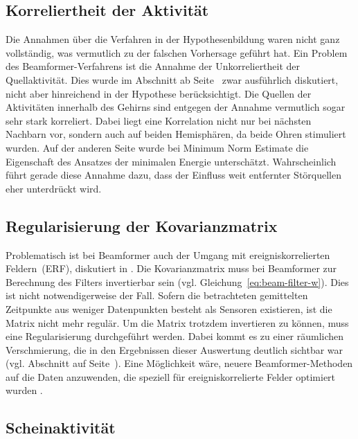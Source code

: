 \documentclass[doc,a4paper,12pt]{apa6}
\makeatletter
\DeclareRobustCommand*{\nameref}[1]{%
      \glqq{\myorg@nameref{#1}}\grqq%
    }%
\makeatother
\begin{document}
\subsection{Korreliertheit der Aktivität}

Die Annahmen über die Verfahren in der Hypothesenbildung waren nicht ganz vollständig, was vermutlich zu der falschen Vorhersage geführt hat. Ein Problem des Beamformer-Verfahrens ist die Annahme der Unkorreliertheit der Quellaktivität. Dies wurde im Abschnitt \nameref{sec:beam} ab Seite~\pageref{sec:beam} zwar ausführlich diskutiert, nicht aber hinreichend in der Hypothese berücksichtigt. Die Quellen der Aktivitäten innerhalb des Gehirns sind entgegen der Annahme vermutlich sogar sehr stark korreliert. Dabei liegt eine Korrelation nicht nur bei nächsten Nachbarn vor, sondern auch auf beiden Hemisphären, da beide Ohren stimuliert wurden. Auf der anderen Seite wurde bei Minimum Norm Estimate die Eigenschaft des Ansatzes der minimalen Energie unterschätzt. Wahrscheinlich führt gerade diese Annahme dazu, dass der Einfluss weit entfernter Störquellen eher unterdrückt wird.

\subsection{Regularisierung der Kovarianzmatrix}
\label{sec:regu-kov}

Problematisch ist bei Beamformer auch der Umgang mit ereigniskorrelierten Feldern~(ERF), diskutiert in \textcite{hansen2010meg}. Die Kovarianzmatrix muss bei Beamformer zur Berechnung des Filters invertierbar sein (vgl. Gleichung~\ref{eq:beam-filter-w}). Dies ist nicht notwendigerweise der Fall. Sofern die betrachteten gemittelten Zeitpunkte aus weniger Datenpunkten besteht als Sensoren existieren, ist die Matrix nicht mehr regulär. Um die Matrix trotzdem invertieren zu können, muss eine Regularisierung durchgeführt werden. Dabei kommt es zu einer räumlichen Verschmierung, die in den Ergebnissen dieser Auswertung deutlich sichtbar war (vgl. Abschnitt \nameref{sec:akti-verteilung} auf Seite~\pageref{sec:akti-verteilung}). Eine Möglichkeit wäre, neuere Beamformer-Methoden auf die Daten anzuwenden, die speziell für ereigniskorrelierte Felder optimiert wurden \parencite[z.B.][]{cheyne2007event}.

\subsection{Scheinaktivität}
\end{document}
